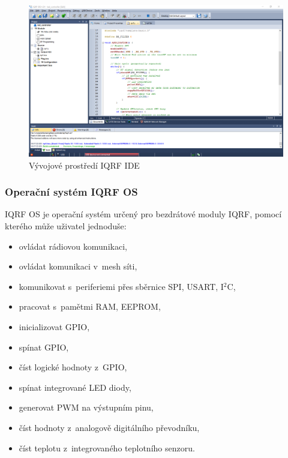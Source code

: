 \documentclass[12pt,a4paper]{article}
\begin{document}
\begin{figure}[H]
\centering
\label{fig:iqrf/ide}
\includegraphics[width = 150mm]{../img/iqrf/ide.png}
\caption{Vývojové prostředí IQRF IDE}
\end{figure}

\newpage

\subsubsection{Operační systém IQRF OS}

IQRF OS\cite{iqrf/os} je operační systém určený pro bezdrátové moduly IQRF, pomocí kterého může uživatel jednoduše:

\begin{itemize}
  \item ovládat rádiovou komunikaci,
  \item ovládat komunikaci v~mesh síti,
  \item komunikovat s~periferiemi přes sběrnice SPI, USART, I$^{2}$C,
  \item pracovat s~pamětmi RAM, EEPROM,
  \item inicializovat GPIO,
  \item spínat GPIO,
  \item číst logické hodnoty z~GPIO,
  \item spínat integrované LED diody,
  \item generovat PWM na výstupním pinu,
  \item číst hodnoty z~analogově digitálního převodníku,
  \item číst teplotu z~integrovaného teplotního senzoru.
\end{itemize}
\end{document}
